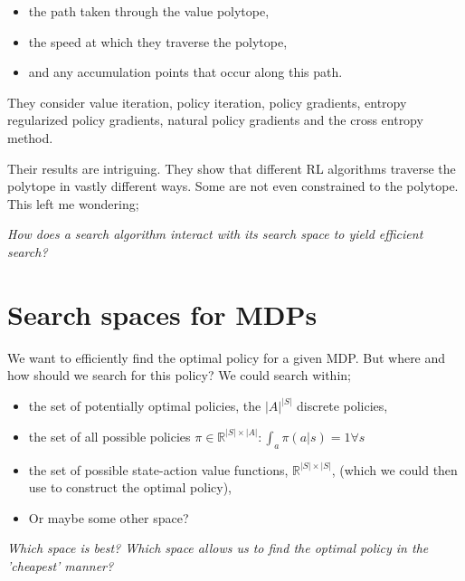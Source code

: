 \begin{itemize}
\tightlist
  \item the path taken through the value polytope,
  \item the speed at which they traverse the polytope,
  \item and any accumulation points that occur along this path.
\end{itemize}


They consider value iteration, policy iteration, policy gradients, entropy regularized policy gradients,
natural policy gradients and the cross entropy method.

Their results are intriguing. They show that different RL algorithms traverse the polytope in vastly different ways.
Some are not even constrained to the polytope. This left me wondering;

\begin{displayquote}
  \textit{How does a search algorithm interact with its search space to yield efficient search?}
\end{displayquote}

\section{Search spaces for MDPs}\label{search-spaces-mdps}

We want to efficiently find the optimal policy for a given MDP. But where and how should we
search for this policy? We could search within;

\begin{itemize}
\tightlist
  \item the set of potentially optimal policies, the $|A|^{|S|}$ discrete policies,
  \item the set of all possible policies $\pi \in \mathbb R^{|S| \times |A|}: \int_a \pi(a|s) = 1 \forall s $
  \item the set of possible state-action value functions, $\mathbb R^{|S|\times|S|}$,
  (which we could then use to construct the optimal policy),
  \item Or maybe some other space?
\end{itemize}

\begin{displayquote}
  \textit{Which space is best? Which space allows us to find the optimal policy in the 'cheapest' manner?}
\end{displayquote}


